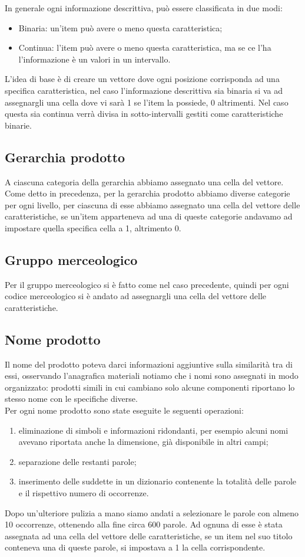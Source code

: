 In generale ogni informazione descrittiva, può essere classificata in due modi:
\begin{itemize}
    \item Binaria: un'item può avere o meno questa caratteristica;
    \item Continua: l'item può avere o meno questa caratteristica, ma se ce l'ha l'informazione è un valori in un intervallo.
\end{itemize}

L'idea di base è di creare un vettore dove ogni posizione corrisponda ad una specifica caratteristica, nel caso l'informazione descrittiva sia binaria si va ad assegnargli una cella dove vi sarà 1 se l'item la possiede, 0 altrimenti. Nel caso questa sia continua verrà divisa in sotto-intervalli gestiti come caratteristiche binarie.

\subsection{Gerarchia prodotto}
A ciascuna categoria della gerarchia abbiamo assegnato una cella del vettore.
Come detto in precedenza, per la gerarchia prodotto abbiamo diverse categorie per ogni livello, per ciascuna di esse abbiamo assegnato una cella del vettore delle caratteristiche, se un'item apparteneva ad una di queste categorie andavamo ad impostare quella specifica cella a 1, altrimento 0.

\subsection{Gruppo merceologico}
Per il gruppo merceologico si è fatto come nel caso precedente, quindi per ogni codice merceologico si è andato ad assegnargli una cella del vettore delle caratteristiche.

\subsection{Nome prodotto}
Il nome del prodotto poteva darci informazioni aggiuntive sulla similarità tra di essi, osservando l'anagrafica materiali notiamo che i nomi sono assegnati in modo organizzato: prodotti simili in cui cambiano solo alcune componenti riportano lo stesso nome con le specifiche diverse.\\
Per ogni nome prodotto sono state eseguite le seguenti operazioni:
\begin{enumerate}
    \item eliminazione di simboli e informazioni ridondanti, per esempio alcuni nomi avevano riportata anche la dimensione, già disponibile in altri campi;
    \item separazione delle restanti parole;
    \item inserimento delle suddette in un dizionario contenente la totalità delle parole e il rispettivo numero di occorrenze.
\end{enumerate}
Dopo un'ulteriore pulizia a mano siamo andati a selezionare le parole con almeno 10 occorrenze, ottenendo alla fine circa 600 parole. Ad ognuna di esse è stata assegnata ad una cella del vettore delle caratteristiche, se un item nel suo titolo conteneva una di queste parole, si impostava a 1 la cella corrispondente.


